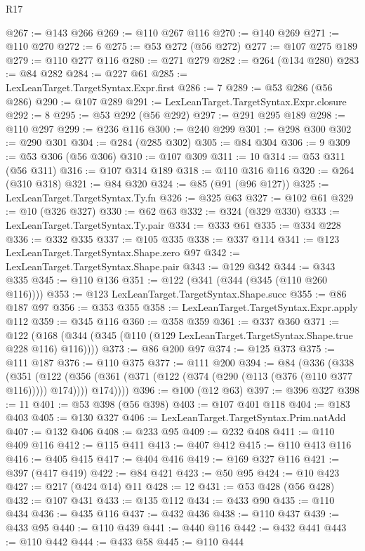 \begin{lexlean}{R17}
\begin{coremodule}
{{{{{{{{{{{{{{{{{{{{{{{{{{{{{{{{{{{{{{{{{{{{{{{{{{{{{{{{{{{{{{{{{{{{{{{{{{{{{{{{{{{{{@267 := @143 @266
@269 := @110 @267 @116
@270 := @140 @269
@271 := @110 @270
@272 := 6
@275 := @53 @272 (@56 @272)
@277 := @107 @275 @189
@279 := @110 @277 @116
@280 := @271 @279
@282 := @264 (@134 @280)
@283 := @84 @282
@284 := @227 @61
@285 := LexLeanTarget.TargetSyntax.Expr.first
@286 := 7
@289 := @53 @286 (@56 @286)
@290 := @107 @289
@291 := LexLeanTarget.TargetSyntax.Expr.closure
@292 := 8
@295 := @53 @292 (@56 @292)
@297 := @291 @295 @189
@298 := @110 @297
@299 := @236 @116
@300 := @240 @299
@301 := @298 @300
@302 := @290 @301
@304 := @284 (@285 @302)
@305 := @84 @304
@306 := 9
@309 := @53 @306 (@56 @306)
@310 := @107 @309
@311 := 10
@314 := @53 @311 (@56 @311)
@316 := @107 @314 @189
@318 := @110 @316 @116
@320 := @264 (@310 @318)
@321 := @84 @320
@324 := @85 (@91 (@96 @127))
@325 := LexLeanTarget.TargetSyntax.Ty.fn
@326 := @325 @63
@327 := @102 @61
@329 := @10 (@326 @327)
@330 := @62 @63
@332 := @324 (@329 @330)
@333 := LexLeanTarget.TargetSyntax.Ty.pair
@334 := @333 @61
@335 := @334 @228
@336 := @332 @335
@337 := @105 @335
@338 := @337 @114
@341 := @123 LexLeanTarget.TargetSyntax.Shape.zero @97
@342 := LexLeanTarget.TargetSyntax.Shape.pair
@343 := @129 @342
@344 := @343 @335
@345 := @110 @136
@351 := @122 (@341 (@344 (@345 (@110 @260 @116))))
@353 := @123 LexLeanTarget.TargetSyntax.Shape.succ
@355 := @86 @187 @97
@356 := @353 @355
@358 := LexLeanTarget.TargetSyntax.Expr.apply @112
@359 := @345 @116
@360 := @358 @359
@361 := @337 @360
@371 := @122 (@168 (@344 (@345 (@110 (@129 LexLeanTarget.TargetSyntax.Shape.true @228 @116) @116))))
@373 := @86 @200 @97
@374 := @125 @373
@375 := @111 @187
@376 := @110 @375
@377 := @111 @200
@394 := @84
    (@336
      (@338
        (@351
          (@122
            (@356 (@361 (@371 (@122 (@374 (@290 (@113 (@376 (@110 @377 @116))))) @174))))
            @174))))
@396 := @100 (@12 @63)
@397 := @396 @327
@398 := 11
@401 := @53 @398 (@56 @398)
@403 := @107 @401 @118
@404 := @183 @403
@405 := @130 @327
@406 := LexLeanTarget.TargetSyntax.Prim.natAdd
@407 := @132 @406
@408 := @233 @95
@409 := @232 @408
@411 := @110 @409 @116
@412 := @115 @411
@413 := @407 @412
@415 := @110 @413 @116
@416 := @405 @415
@417 := @404 @416
@419 := @169 @327 @116
@421 := @397 (@417 @419)
@422 := @84 @421
@423 := @50 @95
@424 := @10 @423
@427 := @217 (@424 @14) @11
@428 := 12
@431 := @53 @428 (@56 @428)
@432 := @107 @431
@433 := @135 @112
@434 := @433 @90
@435 := @110 @434
@436 := @435 @116
@437 := @432 @436
@438 := @110 @437
@439 := @433 @95
@440 := @110 @439
@441 := @440 @116
@442 := @432 @441
@443 := @110 @442
@444 := @433 @58
@445 := @110 @444
}}}}}}}}}}}}}}}}}}}}}}}}}}}}}}}}}}}}}}}}}}}}}}}}}}}}}}}}}}}}}}}}}}}}}}}}}}}}}}}}}}}}}
\end{coremodule}
\end{lexlean}
